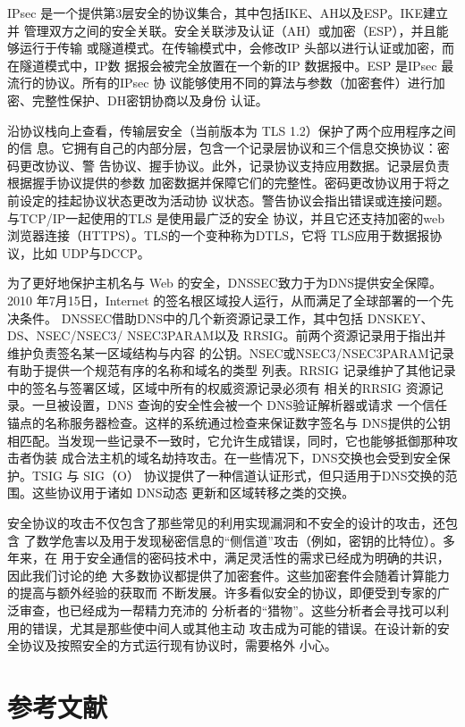 IPsec 是一个提供第3层安全的协议集合，其中包括IKE、AH以及ESP。IKE建立并
管理双方之间的安全关联。安全关联涉及认证（AH）或加密（ESP），并且能够运行于传输
或隧道模式。在传输模式中，会修改IP 头部以进行认证或加密，而在隧道模式中，IP数
据报会被完全放置在一个新的IP 数据报中。ESP 是IPsec 最流行的协议。所有的IPsec 协
议能够使用不同的算法与参数（加密套件）进行加密、完整性保护、DH密钥协商以及身份
认证。

沿协议栈向上查看，传输层安全（当前版本为 TLS 1.2）保护了两个应用程序之间的信
息。它拥有自己的内部分层，包含一个记录层协议和三个信息交换协议：密码更改协议、警
告协议、握手协议。此外，记录协议支持应用数据。记录层负责根据握手协议提供的参数
加密数据并保障它们的完整性。密码更改协议用于将之前设定的挂起协议状态更改为活动协
议状态。警告协议会指出错误或连接问题。与TCP/IP一起使用的TLS 是使用最广泛的安全
协议，并且它还支持加密的web 浏览器连接（HTTPS）。TLS的一个变种称为DTLS，它将
TLS应用于数据报协议，比如 UDP与DCCP。

为了更好地保护主机名与 Web 的安全，DNSSEC致力于为DNS提供安全保障。2010
年7月15日，Internet 的签名根区域投人运行，从而满足了全球部署的一个先决条件。
DNSSEC借助DNS中的几个新资源记录工作，其中包括 DNSKEY、DS、NSEC/NSEC3/
NSEC3PARAM以及 RRSIG。前两个资源记录用于指出并维护负责签名某一区域结构与内容
的公钥。NSEC或NSEC3/NSEC3PARAM记录有助于提供一个规范有序的名称和域名的类型
列表。RRSIG 记录维护了其他记录中的签名与签署区域，区域中所有的权威资源记录必须有
相关的RRSIG 资源记录。一旦被设置，DNS 查询的安全性会被一个 DNS验证解析器或请求
一个信任锚点的名称服务器检查。这样的系统通过检查来保证数字签名与 DNS提供的公钥
相匹配。当发现一些记录不一致时，它允许生成错误，同时，它也能够抵御那种攻击者伪装
成合法主机的域名劫持攻击。在一些情况下，DNS交换也会受到安全保护。TSIG 与 SIG（O）
协议提供了一种信道认证形式，但只适用于DNS交换的范围。这些协议用于诸如 DNS动态
更新和区域转移之类的交换。

安全协议的攻击不仅包含了那些常见的利用实现漏洞和不安全的设计的攻击，还包含
了数学危害以及用于发现秘密信息的“侧信道”攻击（例如，密钥的比特位）。多年来，在
用于安全通信的密码技术中，满足灵活性的需求已经成为明确的共识，因此我们讨论的绝
大多数协议都提供了加密套件。这些加密套件会随着计算能力的提高与额外经验的获取而
不断发展。许多看似安全的协议，即便受到专家的广泛审查，也已经成为一帮精力充沛的
分析者的“猎物”。这些分析者会寻找可以利用的错误，尤其是那些使中间人或其他主动
攻击成为可能的错误。在设计新的安全协议及按照安全的方式运行现有协议时，需要格外
小心。

\section{参考文献}

